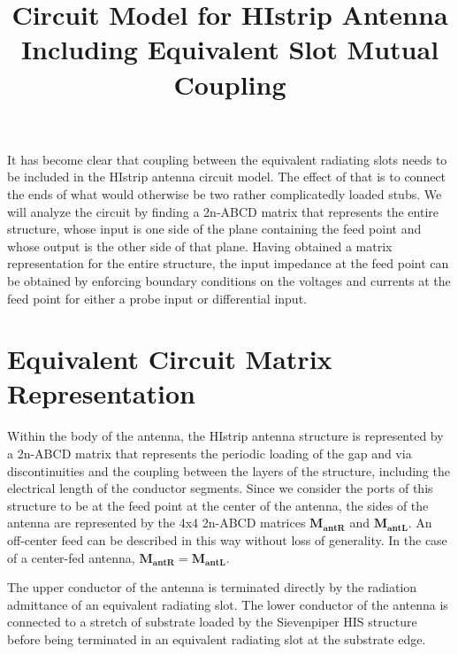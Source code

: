 \documentclass{article}
\title{Circuit Model for HIstrip Antenna Including Equivalent Slot Mutual Coupling}
\begin{document}
\maketitle
It has become clear that coupling between the equivalent radiating slots needs to be included in the HIstrip antenna circuit model.  The effect of that is to connect the ends of what would otherwise be two rather complicatedly loaded stubs.  We will analyze the circuit by finding a 2n-ABCD matrix that represents the entire structure, whose input is one side of the plane containing the feed point and whose output is the other side of that plane.  Having obtained a matrix representation for the entire structure, the input impedance at the feed point can be obtained by enforcing boundary conditions on the voltages and currents at the feed point for either a probe input or differential input.

\section{Equivalent Circuit Matrix Representation}
Within the body of the antenna, the HIstrip antenna structure is represented by a 2n-ABCD matrix that represents the periodic loading of the gap and via discontinuities and the coupling between the layers of the structure, including the electrical length of the conductor segments.  Since we consider the ports of this structure to be at the feed point at the center of the antenna, the sides of the antenna are represented by the 4x4 2n-ABCD matrices $\mathbf{M_{antR}}$ and $\mathbf{M_{antL}}$.  An off-center feed can be described in this way without loss of generality.  In the case of a center-fed antenna, $\mathbf{M_{antR}}=\mathbf{M_{antL}}$.

The upper conductor of the antenna is terminated directly by the radiation admittance of an equivalent radiating slot.  The lower conductor of the antenna is connected to a stretch of substrate loaded by the Sievenpiper HIS structure before being terminated in an equivalent radiating slot at the substrate edge.  
\end{document}
